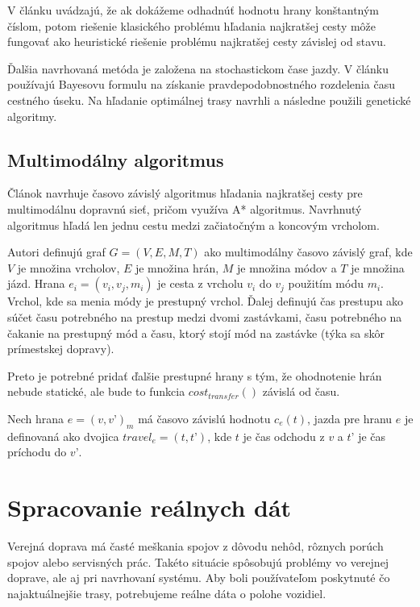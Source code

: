 V článku \cite{trains} uvádzajú, že ak dokážeme odhadnúť hodnotu hrany konštantným číslom, potom riešenie klasického problému hľadania najkratšej cesty môže fungovať ako heuristické riešenie problému najkratšej cesty závislej od stavu.

Ďalšia navrhovaná metóda je založena na stochastickom čase jazdy. V článku \cite{stochastic} používajú Bayesovu formulu na získanie pravdepodobnostného rozdelenia času cestného úseku. Na hľadanie optimálnej trasy navrhli a následne použili genetické algoritmy.

\subsection{Multimodálny algoritmus}
\label{sec:multimodal-algorithm}
Článok \cite{timedependent} navrhuje časovo závislý algoritmus hľadania najkratšej cesty pre multimodálnu dopravnú sieť, pričom využíva A* algoritmus. Navrhnutý algoritmus hľadá len jednu cestu medzi začiatočným a koncovým vrcholom. 

Autori definujú graf $G = (V, E, M, T)$ ako multimodálny časovo závislý graf, kde $V$ je množina vrcholov, $E$ je množina hrán, $M$ je množina módov a $T$ je množina jázd.
Hrana $e_i = (v_i, v_j, m_i)$ je cesta z vrcholu $v_i$ do $v_j$ použitím módu $m_i$. Vrchol, kde sa menia módy je prestupný vrchol. Ďalej definujú čas prestupu ako súčet času potrebného na prestup medzi dvomi zastávkami, času potrebného na čakanie na prestupný mód a času, ktorý stojí mód na zastávke (týka sa skôr prímestskej dopravy).

Preto je potrebné pridať ďalšie prestupné hrany s tým, že ohodnotenie hrán nebude statické, ale bude to funkcia $cost_{transfer}()$ závislá od času.

Nech hrana $e = (v, v’)_m$ má časovo závislú hodnotu $c_e(t)$, jazda pre hranu $e$ je definovaná ako dvojica $travel_e = (t, t’)$, kde $t$ je čas odchodu z $v$ a $t’$ je čas príchodu do $v’$.

\section{Spracovanie reálnych dát}
\label{sec:models}
Verejná doprava má časté meškania spojov z dôvodu nehôd, rôznych porúch spojov alebo servisných prác. Takéto situácie spôsobujú problémy vo verejnej doprave, ale aj pri navrhovaní systému. Aby boli používateľom poskytnuté čo najaktuálnejšie trasy, potrebujeme reálne dáta o polohe vozidiel.


